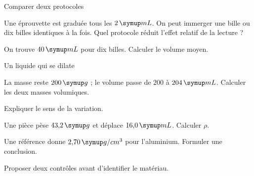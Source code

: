\par\noindent\begin{minipage}{\linewidth}
\begin{exercice}[3]{Comparer deux protocoles}
\begin{questions}
\item Une éprouvette est graduée tous les $2\unite{mL}$. On peut immerger une bille ou dix billes identiques à la fois. Quel protocole réduit l’effet relatif de la lecture ?
\item On trouve $40\unite{mL}$ pour dix billes. Calculer le volume moyen.
\end{questions}
\end{exercice}
\end{minipage}
\par\noindent\begin{minipage}{\linewidth}
\begin{exercice}[3]{Un liquide qui se dilate}
\begin{questions}
\item La masse reste $200\unite g$ ; le volume passe de $200$ à $204\unite{mL}$. Calculer les deux masses volumiques.
\item Expliquer le sens de la variation.
\end{questions}
\end{exercice}
\end{minipage}
\label{defi-ex-1}
\begin{questions}
\item Une pièce pèse $43{,}2\unite g$ et déplace $16{,}0\unite{mL}$. Calculer $\rho$.
\item Une référence donne $2{,}70\unite{g/cm^3}$ pour l’aluminium. Formuler une conclusion.
\item Proposer deux contrôles avant d’identifier le matériau.
\end{questions}
\pcGrille
